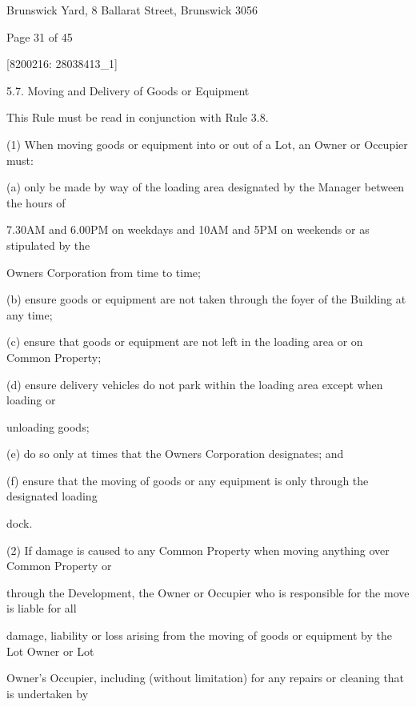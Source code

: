 \documentclass{article}
\begin{document}
{\fontsize{9}{1}Brunswick Yard, 8 Ballarat Street, Brunswick 3056 }


{\fontsize{9}{1}Page 31  of 45 }



{\fontsize{7.02}{1}[8200216: 28038413\_1] }

{\fontsize{9.99}{1}5.7. Moving and Delivery of Goods or Equipment }

{\fontsize{10.02}{1}This Rule must be read in conjunction with Rule 3.8. }

{\fontsize{9.962}{1}(1) When moving goods or equipment into or out of a Lot, an Owner or Occupier must: }

{\fontsize{9.962}{1}(a) only be made by way of the loading area designated by the Manager between the hours of }

{\fontsize{10.02}{1}7.30AM and 6.00PM on weekdays and 10AM and 5PM on weekends or as stipulated by the }

{\fontsize{10.02}{1}Owners Corporation from time to time; }

{\fontsize{9.962}{1}(b) ensure goods or equipment are not taken through the foyer of the Building at any time; }

{\fontsize{9.962}{1}(c) ensure that goods or equipment are not left in the loading area or on Common Property; }

{\fontsize{9.962}{1}(d) ensure delivery vehicles do not park within the loading area except when loading or }

{\fontsize{10.02}{1}unloading goods; }

{\fontsize{9.962}{1}(e) do so only at times that the Owners Corporation designates; and }

{\fontsize{9.962}{1}(f) ensure that the moving of goods or any equipment is only through the designated loading }

{\fontsize{10.02}{1}dock. }

{\fontsize{9.962}{1}(2) If damage is caused to any Common Property when moving anything over Common Property or }

{\fontsize{10.02}{1}through the Development, the Owner or Occupier who is responsible for the move is liable for all }

{\fontsize{10.02}{1}damage, liability or loss arising from the moving of goods or equipment by the Lot Owner or Lot }

{\fontsize{10.02}{1}Owner’s Occupier, including (without limitation) for any repairs or cleaning that is undertaken by }
\end{document}
